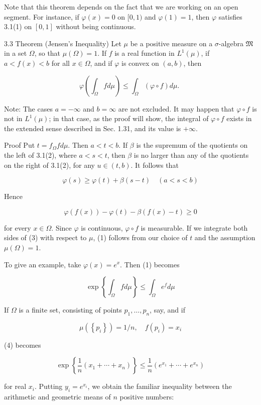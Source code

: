 \documentclass[10pt]{article}
\begin{document}
Note that this theorem depends on the fact that we are working on an open segment. For instance, if $\varphi(x)=0$ on $[0,1)$ and $\varphi(1)=1$, then $\varphi$ satisfies 3.1(1) on $[0,1]$ without being continuous.

3.3 Theorem (Jensen's Inequality) Let $\mu$ be a positive measure on a $\sigma$-algebra $\mathfrak{M}$ in a set $\Omega$, so that $\mu(\Omega)=1$. If $f$ is a real function in $L^{1}(\mu)$, if $a<f(x)<b$ for all $x \in \Omega$, and if $\varphi$ is convex on $(a, b)$, then

$$
\varphi\left(\int_{\Omega} f d \mu\right) \leq \int_{\Omega}(\varphi \circ f) d \mu \text {. }
$$

Note: The cases $a=-\infty$ and $b=\infty$ are not excluded. It may happen that $\varphi \circ f$ is not in $L^{1}(\mu)$; in that case, as the proof will show, the integral of $\varphi \circ f$ exists in the extended sense described in Sec. 1.31, and its value is $+\infty$.

Proof Put $t=f_{\Omega} f d \mu$. Then $a<t<b$. If $\beta$ is the supremum of the quotients on the left of 3.1(2), where $a<s<t$, then $\beta$ is no larger than any of the quotients on the right of 3.1(2), for any $u \in(t, b)$. It follows that

$$
\varphi(s) \geq \varphi(t)+\beta(s-t) \quad(a<s<b)
$$

Hence

$$
\varphi(f(x))-\varphi(t)-\beta(f(x)-t) \geq 0
$$

for every $x \in \Omega$. Since $\varphi$ is continuous, $\varphi \circ f$ is measurable. If we integrate both sides of (3) with respect to $\mu$, (1) follows from our choice of $t$ and the assumption $\mu(\Omega)=1$.

To give an example, take $\varphi(x)=e^{x}$. Then (1) becomes

$$
\exp \left\{\int_{\Omega} f d \mu\right\} \leq \int_{\Omega} e^{f} d \mu
$$

If $\Omega$ is a finite set, consisting of points $p_{1}, \ldots, p_{n}$, say, and if

$$
\mu\left(\left\{p_{i}\right\}\right)=1 / n, \quad f\left(p_{i}\right)=x_{i}
$$

(4) becomes

$$
\exp \left\{\frac{1}{n}\left(x_{1}+\cdots+x_{n}\right)\right\} \leq \frac{1}{n}\left(e^{x_{1}}+\cdots+e^{x_{n}}\right)
$$

for real $x_{i}$. Putting $y_{i}=e^{x_{i}}$, we obtain the familiar inequality between the arithmetic and geometric means of $n$ positive numbers:
\end{document}
